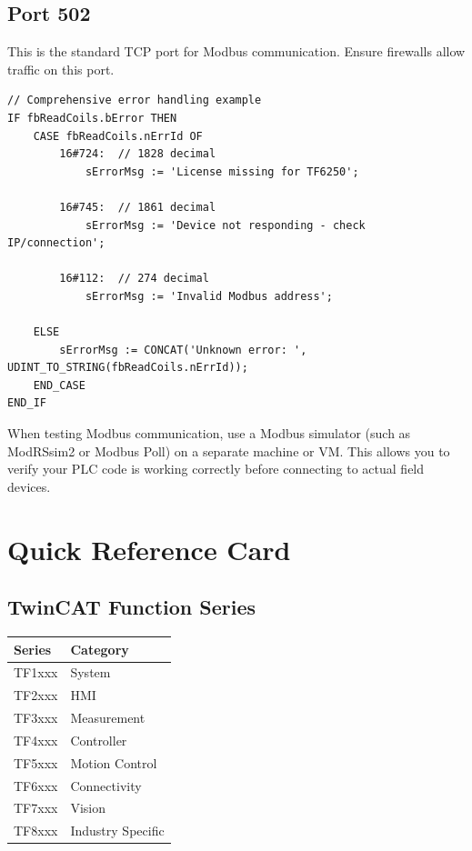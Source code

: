 \documentclass[11pt,a4paper]{article}
\begin{document}
\subsection{Port 502}
This is the standard TCP port for Modbus communication. Ensure firewalls allow traffic on this port.

\begin{lstlisting}
// Comprehensive error handling example
IF fbReadCoils.bError THEN
    CASE fbReadCoils.nErrId OF
        16#724:  // 1828 decimal
            sErrorMsg := 'License missing for TF6250';
            
        16#745:  // 1861 decimal
            sErrorMsg := 'Device not responding - check IP/connection';
            
        16#112:  // 274 decimal
            sErrorMsg := 'Invalid Modbus address';
            
    ELSE
        sErrorMsg := CONCAT('Unknown error: ', UDINT_TO_STRING(fbReadCoils.nErrId));
    END_CASE
END_IF
\end{lstlisting}

\begin{tipbox}
When testing Modbus communication, use a Modbus simulator (such as ModRSsim2 or Modbus Poll) on a separate machine or VM. This allows you to verify your PLC code is working correctly before connecting to actual field devices.
\end{tipbox}

\section*{Quick Reference Card}

\subsection*{TwinCAT Function Series}

\begin{table}[h]
\centering
\begin{tabular}{@{}ll@{}}
\toprule
\textbf{Series} & \textbf{Category} \\
\midrule
TF1xxx & System \\
TF2xxx & HMI \\
TF3xxx & Measurement \\
TF4xxx & Controller \\
TF5xxx & Motion Control \\
TF6xxx & Connectivity \\
TF7xxx & Vision \\
TF8xxx & Industry Specific \\
\bottomrule
\end{tabular}
\end{table}
\end{document}
